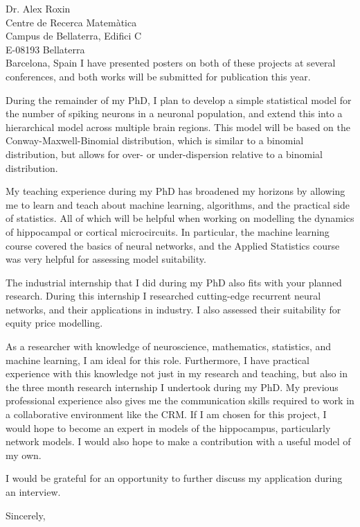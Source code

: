 \documentclass[11pt]{letter} %
\begin{document}
\begin{letter}{Dr. Alex Roxin \\ 
  Centre de Recerca Matem\`{a}tica \\ 
  Campus de Bellaterra, Edifici C \\
  E-08193 Bellaterra \\
  Barcelona, Spain}
  I have presented posters on both of these projects at several conferences, and both works will be submitted for publication this year. 

  During the remainder of my PhD, I plan to develop a simple statistical model for the number of spiking neurons in a neuronal population, and extend this into a hierarchical model across multiple brain regions. This model will be based on the Conway-Maxwell-Binomial distribution, which is similar to a binomial distribution, but allows for over- or under-dispersion relative to a binomial distribution. 

  My teaching experience during my PhD has broadened my horizons by allowing me to learn and teach about machine learning, algorithms, and the practical side of statistics. All of which will be helpful when working on modelling the dynamics of hippocampal or cortical microcircuits. In particular, the machine learning course covered the basics of neural networks, and the Applied Statistics course was very helpful for assessing model suitability.

  The industrial internship that I did during my PhD also fits with your planned research. During this internship I researched cutting-edge recurrent neural networks, and their applications in industry. I also assessed their suitability for equity price modelling.

  As a researcher with knowledge of neuroscience, mathematics, statistics, and machine learning, I am ideal for this role. Furthermore, I have practical experience with this knowledge not just in my research and teaching, but also in the three month research internship I undertook during my PhD. My previous professional experience also gives me the communication skills required to work in a collaborative environment like the CRM. If I am chosen for this project, I would hope to become an expert in models of the hippocampus, particularly network models. I would also hope to make a contribution with a useful model of my own.

  I would be grateful for an opportunity to further discuss my application during an interview.

  \vspace{2\parskip} %
  \closing{Sincerely,}
  \vspace{2\parskip} %




\end{letter}
 
\end{document}
